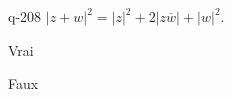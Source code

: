\begin{truefalse}{q-208}
$|z+w|^2= |z|^2+2|z\overline w|+|w|^2$.
\item Vrai
\item* Faux
\end{truefalse}

